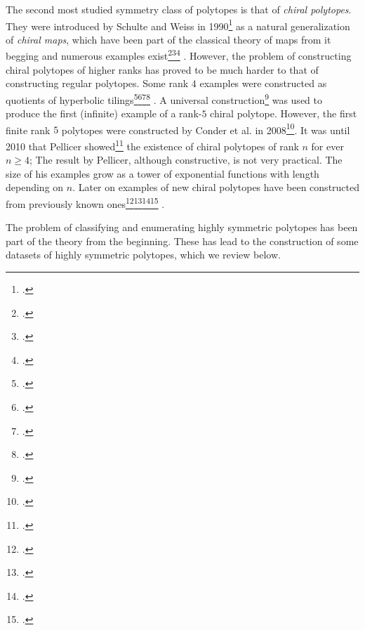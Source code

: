 The second most studied symmetry class of polytopes is that of \emph{chiral polytopes}.
They were introduced by Schulte and Weiss in 1990\footcite{SchulteWeiss_1991_ChiralPolytopes}
as a natural generalization of \emph{chiral maps}, which have been part of the classical theory of maps from it begging and numerous examples exist\footcite{CoxeterMoser_1972_GeneratorsRelationsDiscrete}\footcite{ConderDobcsanyi_2001_DeterminationAllRegular}\footcite{Sherk_1962_FamilyRegularMaps} .
However, the problem of constructing chiral polytopes of higher ranks has proved to be much harder to that of constructing regular polytopes.
Some rank $4$ examples were constructed as quotients of hyperbolic tilings\footcite{NostrandSchulteWeiss_1993_ConstructionsChiralPolytopes}\footcite{SchulteWeiss_1994_ChiralityProjectiveLinear}\footcite{Nostrand_1994_RingExtensionsChiral}\footcite{NostrandSchulte_1995_ChiralPolytopesHyperbolic} .
A universal construction\footcite{SchulteWeiss_1995_FreeExtensionsChiral} was used to produce the first (infinite) example of a rank-$5$ chiral polytope.
However, the first finite rank $5$ polytopes were constructed by Conder et al. in 2008\footcite{ConderHubardPisanski_2008_ConstructionsChiralPolytopes}.
It was until 2010 that Pellicer showed\footcite{Pellicer_2010_ConstructionHigherRank} the existence of chiral polytopes of rank $n$ for ever $n \geq 4$;
The result by Pellicer, although constructive, is not very practical. The size of his examples grow as a tower of exponential functions with length depending on $n$.
Later on examples of new chiral polytopes have been constructed from previously known ones\footcite{CunninghamPellicer_2014_ChiralExtensionsChiral}\footcite{ConderZhang_2017_AbelianCoversChiral}\footcite{Montero_2019_ChiralExtensionsToroids_PhDThesis}\footcite{Montero_2021_SchlaefliSymbolChiral} .

The problem of classifying and enumerating highly symmetric polytopes has been part of the theory from the beginning.
These has lead to the construction of some datasets of highly symmetric polytopes, which we review below.

